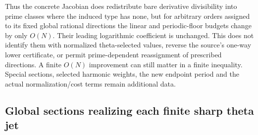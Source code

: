 \documentclass[11pt,a4paper]{article}
\theoremstyle{definition}\newtheorem{remark}[theorem]{Remark}
\begin{document}
Thus the concrete Jacobian does redistribute bare derivative divisibility into prime classes where the induced type has none, but for arbitrary orders assigned to its fixed global rational directions the linear and periodic-floor budgets change by only $O(N)$. Their leading logarithmic coefficient is unchanged. This does not identify them with normalized theta-selected values, reverse the source's one-way  lower certificate, or permit prime-dependent reassignment of prescribed directions. A finite $O(N)$ improvement can still matter in a finite inequality. Special sections, selected harmonic weights, the new endpoint period and the actual normalization/cost terms remain additional data.


\subsection{Global sections realizing each finite sharp theta jet}
\end{document}

